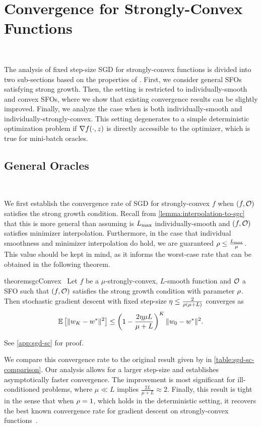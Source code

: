 \section{Convergence for Strongly-Convex Functions}~\label{sec:sgd-sc}

The analysis of fixed step-size \ac{SGD} for strongly-convex functions is divided into two sub-sections based on the properties of \oracle{}.
First, we consider general \acp{SFO} satisfying strong growth. 
Then, the setting is restricted to individually-smooth and convex \acp{SFO}, where we show that existing convergence results can be slightly improved.
Finally, we analyze the case when \oracle{} is both individually-smooth and individually-strongly-convex.
This setting degenerates to a simple deterministic optimization problem if \( \grad(\cdot, z) \) is directly accessible to the optimizer, which is true for mini-batch oracles. 

\subsection{General Oracles}~\label{sec:sgd-sc-general}

We first establish the convergence rate of \ac{SGD} for strongly-convex \( f \) when \( \rbr{f, \oracle} \) satisfies the strong growth condition. 
Recall from \autoref{lemma:interpolation-to-sgc} that this is more general than assuming \oracle{} is \( \Lmax \) individually-smooth and \( \rbr{f, \oracle} \) satisfies minimizer interpolation. 
Furthermore, in the case that individual smoothness and minimizer interpolation do hold, we are guaranteed \( \sgc \leq \frac{\Lmax}{\mu} \).
This value should be kept in mind, as it informs the worst-case rate that can be obtained in the following theorem. 

\begin{restatable}{theorem}{sgcConvex}~\label{thm:sgc-convex}
    Let \( f \) be a \( \mu \)-strongly-convex, \( L \)-smooth function and \( \oracle{} \) a \ac{SFO} such that \( \rbr{f, \oracle{}} \) satisfies the strong growth condition with parameter \( \sgc \).
    Then stochastic gradient descent with fixed step-size \( \eta \leq \frac{2}{\sgc(\mu + L)} \) converges as 
    \[ \E\sbr{\norm{\w_{K} - \wopt}^2} \leq \rbr{1 - \frac{2\eta \mu L}{\mu + L}}^K \norm{\w_0 - \wopt}^2. \] 
\end{restatable}%
\noindent See \autoref{app:sgd-sc} for proof.\hfill \break

We compare this convergence rate to the original result given by \citet[Section 6]{schmidt2013fast} in \autoref{table:sgd-sc-comparison}.
Our analysis allows for a larger step-size and establishes asymptotically faster convergence.
The improvement is most significant for ill-conditioned problems, where \( \mu \ll L \) implies \( \frac{2 L}{\mu + L} \approx 2 \). 
Finally, this result is tight in the sense that when \( \sgc = 1 \), which holds in the deterministic setting, it recovers the best known convergence rate for gradient descent on strongly-convex functions~\citep[Theorem 3.12]{bubeck2015convex}.

